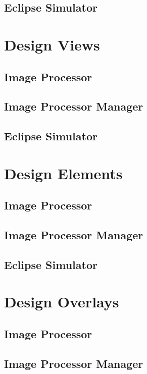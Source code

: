 \documentclass[10pt, onecolumn, draftclsnofoot, letterpaper, compsoc]{IEEEtran}
\begin{document}
\subsection{Eclipse Simulator}


\section{Design Views}

\subsection{Image Processor}

\subsection{Image Processor Manager}

\subsection{Eclipse Simulator}


\section{Design Elements}

\subsection{Image Processor}

\subsection{Image Processor Manager}

\subsection{Eclipse Simulator}


\section{Design Overlays}

\subsection{Image Processor}

\subsection{Image Processor Manager}
\end{document}
